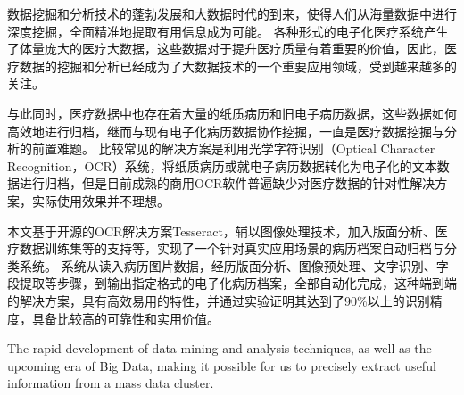 ﻿\begin{cnabstract}
数据挖掘和分析技术的蓬勃发展和大数据时代的到来，使得人们从海量数据中进行深度挖掘，全面精准地提取有用信息成为可能。
各种形式的电子化医疗系统产生了体量庞大的医疗大数据，这些数据对于提升医疗质量有着重要的价值，因此，医疗数据的挖掘和分析已经成为了大数据技术的一个重要应用领域，受到越来越多的关注。

与此同时，医疗数据中也存在着大量的纸质病历和旧电子病历数据，这些数据如何高效地进行归档，继而与现有电子化病历数据协作挖掘，一直是医疗数据挖掘与分析的前置难题。
比较常见的解决方案是利用光学字符识别（Optical Character Recognition，OCR）系统，将纸质病历或就电子病历数据转化为电子化的文本数据进行归档，但是目前成熟的商用OCR软件普遍缺少对医疗数据的针对性解决方案，实际使用效果并不理想。

本文基于开源的OCR解决方案Tesseract，辅以图像处理技术，加入版面分析、医疗数据训练集等的支持等，实现了一个针对真实应用场景的病历档案自动归档与分类系统。
系统从读入病历图片数据，经历版面分析、图像预处理、文字识别、字段提取等步骤，到输出指定格式的电子化病历档案，全部自动化完成，这种端到端的解决方案，具有高效易用的特性，并通过实验证明其达到了90\%以上的识别精度，具备比较高的可靠性和实用价值。

\end{cnabstract}

\begin{enabstract}
The rapid development of data mining and analysis techniques, as well as the upcoming era of Big Data, making it possible for us to precisely extract useful information from a mass data cluster.

\end{enabstract}

